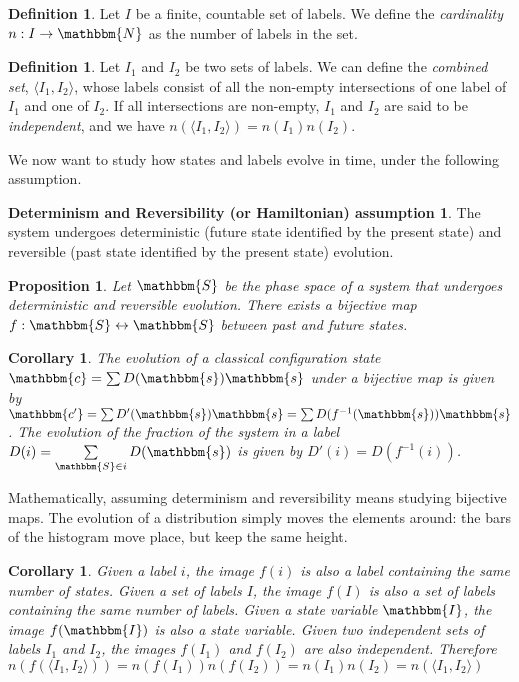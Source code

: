 \documentclass[aps,pra,10pt,twocolumn,floatfix,nofootinbib]{revtex4-1}
\newtheorem{cor}[thm]{Corollary}
\newtheorem{prop}[thm]{Proposition}
\theoremstyle{definition}
\newtheorem{defn}[thm]{Definition}
\newtheorem*{assump2}{Determinism and Reversibility (or Hamiltonian) assumption}
\begin{document}
\begin{defn}\label{discreteCardinality}
Let $I$ be a finite, countable set of labels. We define the \emph{cardinality} $n: I \rightarrow \mathbbm{N}$ as the number of labels in the set.
\end{defn}

\begin{defn}\label{labelsCombine}
Let $I_1$ and $I_2$ be two sets of labels. We can define the \emph{combined set}, $\langle I_1, I_2 \rangle$, whose labels consist of all the non-empty intersections of one label of $I_1$ and one of $I_2$. If all intersections are non-empty, $I_1$ and $I_2$ are said to be \emph{independent}, and we have $n(\langle I_1, I_2 \rangle)=n(I_1)n(I_2)$.
\end{defn}

We now want to study how states and labels evolve in time, under the following assumption.

\begin{assump2}
The system undergoes deterministic (future state identified by the present state) and reversible (past state identified by the present state) evolution.
\end{assump2}

\begin{prop}\label{detrevMap}
Let $\mathbbm{S}$ be the phase space of a system that undergoes deterministic and reversible evolution. There exists a bijective map $f:\mathbbm{S} \leftrightarrow \mathbbm{S}$ between past and future states.
\end{prop}

\begin{cor}\label{detrevDist}
The evolution of a classical configuration state $\mathbbm{c}=\sum D(\mathbbm{s}) \mathbbm{s}$ under a bijective map is given by $\mathbbm{c'}=\sum D'(\mathbbm{s}) \mathbbm{s}=\sum D(f^{-1}(\mathbbm{s})) \mathbbm{s}$. The evolution of the fraction of the system in a label $D(i)=\sum\limits_{\mathbbm{S} \in i} D(\mathbbm{s})$ is given by $D'(i)=D(f^{-1}(i))$.
\end{cor}

Mathematically, assuming determinism and reversibility means studying bijective maps. The evolution of a distribution simply moves the elements around: the bars of the histogram move place, but keep the same height.

\begin{cor}\label{labelsCount}
Given a label $i$, the image $f(i)$ is also a label containing the same number of states. Given a set of labels $I$, the image $f(I)$ is also a set of labels containing the same number of labels. Given a state variable $\mathbbm{I}$, the image $f(\mathbbm{I})$ is also a state variable. Given two independent sets of labels $I_1$ and $I_2$, the images $f(I_1)$ and $f(I_2)$ are also independent. Therefore $n(f(\langle I_1, I_2 \rangle))=n(f(I_1))n(f(I_2))=n(I_1)n(I_2)=n(\langle I_1, I_2 \rangle)$
\end{cor}
\end{document}
